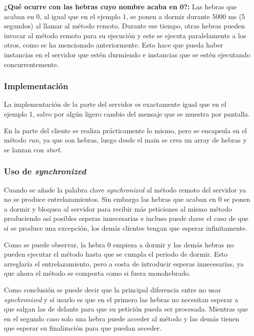 \documentclass{article}
\begin{document}

\textbf{¿Qué ocurre con las hebras cuyo nombre acaba en 0?: }Las hebras que acaban en 0, al igual que en el ejemplo 1, se ponen a dormir durante 5000 ms (5 segundos) al llamar al método remoto. Durante ese tiempo, otras hebras pueden invocar al método remoto para su ejecución y este se ejecuta paralelamente a los otros, como se ha mencionado anteriormente. Esto hace que pueda haber instancias en el servidor que estén durmiendo e instancias que se estén ejecutando concurrentemente.

\subsubsection{Implementación}
La implementación de la parte del servidor es exactamente igual que en el ejemplo 1, salvo por algún ligero cambio del mensaje que se muestra por pantalla.


En la parte del cliente se realiza prácticamente lo mismo, pero se encapsula en el método \textit{run}, ya que son hebras, luego desde el main se crea un array de hebras y se lanzan con \textit{start}.

\subsubsection{Uso de \textit{synchronized}}
Cuando se añade la palabra clave \textit{synchronized} al método remoto del servidor ya no se produce entrelazamientos. Sin embargo las hebras que acaban en 0 se ponen a dormir y bloquea al servidor para recibir más peticiones al mismo método produciendo así posibles esperas innecesarias e incluso puede darse el caso de que si se produce una excepción, los demás clientes tengan que esperar infinitamente. 

Como se puede observar, la hebra 0 empieza a dormir y las demás hebras no pueden ejecutar el método hasta que se cumpla el periodo de dormir. Esto arreglaría el entrelazamiento, pero a costa de introducir esperas innecesarias, ya que ahora el método se comporta como si fuera monohebrado.

Como conclusión se puede decir que la principal diferencia entre no usar \textit{synchronized} y sí usarlo es que en el primero las hebras no necesitan esperar a que salgan las de delante para que su petición pueda ser procesada. Mientras que en el segundo caso solo una hebra puede acceder al método y las demás tienen que esperar su finalización para que puedan acceder.
\end{document}
